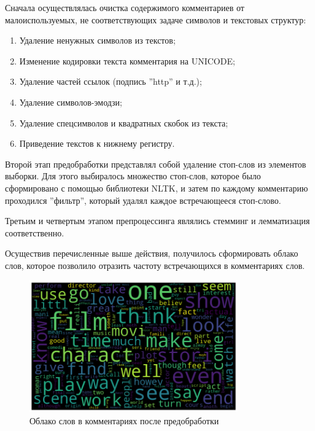 \documentclass[bachelor, och, coursework]{SCWorks}
\begin{document}
        Сначала осуществлялась очистка содержимого комментариев от
        малоиспользуемых, не соответствующих задаче символов и текстовых
        структур:

        \begin{enumerate}
            \item Удаление ненужных символов из текстов;
            \item Изменение кодировки текста комментария на UNICODE;
            \item Удаление частей ссылок (подпись ''http'' и т.д.);
            \item Удаление символов-эмодзи;
            \item Удаление спецсимволов и квадратных скобок из текста;
            \item Приведение текстов к нижнему регистру.
        \end{enumerate}

        Второй этап предобработки представлял собой удаление стоп-слов из
        элементов выборки. Для этого выбиралось множество стоп-слов, которое
        было сформировано с помощью библиотеки NLTK, и затем по каждому
        комментарию проходился ''фильтр'', который удалял каждое встречающееся
        стоп-слово.

        Третьим и четвертым этапом препроцессинга являлись стемминг и
        лемматизация соответственно.

        Осуществив перечисленные выше действия, получилось сформировать облако
        слов, которое позволило отразить частоту встречающихся в комментариях
        слов.

        \begin{figure}[H]
            \centering
            \includegraphics[width=0.8\textwidth]{pic/cloud.png}
            \caption{Облако слов в комментариях после предобработки}
        \end{figure}
\end{document}

